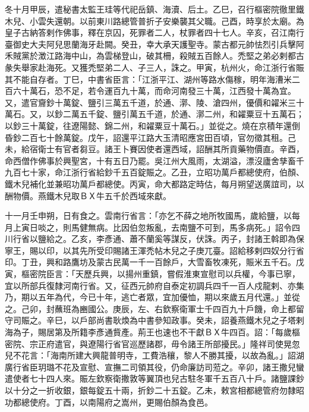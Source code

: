 \begin{pinyinscope}
 冬十月甲辰，遣秘書太監王珪等代祀岳鎮、海瀆、后土。乙巳，召行樞密院徹里鐵木兒、小雲失還朝。以前東川路總管普折子安樂襲其父職。己酉，時享於太廟。為皇子古納答剌作佛事，釋在京囚，死罪者二人，杖罪者四十七人。辛亥，召江南行臺御史大夫阿兒思蘭海牙赴闕。癸丑，幸大承天護聖寺。蒙古都元帥怯烈引兵擊阿禾賊黨於澂江路海中山，為雲梯登山，破其柵，殺賊五百餘人。禿堅之弟必剌都古彖失舉家赴海死。又獲禿堅弟二人、子三人，誅之。甲寅，杭州火，命江浙行省賑其不能自存者。丁巳，中書省臣言：「江浙平江、湖州等路水傷稼，明年海漕米二百六十萬石，恐不足，若令運百九十萬，而命河南發三十萬，江西發十萬為宜。又，遣官齎鈔十萬錠、鹽引三萬五千道，於通、漷、陵、滄四州，優價和糴米三十萬石。又，以鈔二萬五千錠、鹽引萬五千道，於通、漷二州，和糴粟豆十五萬石；以鈔三十萬錠，往遼陽懿、錦二州，和糴粟豆十萬石。」並從之。燒在京積年還倒昏鈔二百七十餘萬錠。戊午，詔還平江路大玉清昭應宮田百頃，官勿徵其租。己未，給宿衛士有官者芻豆。諸王卜賽因使者還西域，詔酬其所貢藥物價直。辛酉，命西僧作佛事於興聖宮，十有五日乃罷。吳江州大風雨，太湖溢，漂沒廬舍孳畜千九百七十家，命江浙行省給鈔千五百錠賑之。乙丑，立昭功萬戶都總使府，伯顏、鐵木兒補化並兼昭功萬戶都總使。丙寅，命大都路定時估，每月朔望送廣誼司，以酬物價。燕鐵木兒取ＢＸ牛五千於西域來獻。



 十一月壬申朔，日有食之。雲南行省言：「亦乞不薛之地所牧國馬，歲給鹽，以每月上寅日啖之，則馬健無病。比因伯忽叛亂，去南鹽不可到，馬多病死。」詔令四川行省以鹽給之。乙亥，李彥通、蕭不蘭奚等謀反，伏誅。丙子，封諸王斡即為保寧王，賜以印，以其先所受印賜諸王渾禿帖木兒之子庚兀臺。詔給移剌四奴分行省印。丁丑，興和路鷹坊及蒙古民萬一千一百餘戶，大雪畜牧凍死，賑米五千石。戊寅，樞密院臣言：「天歷兵興，以揚州重鎮，嘗假淮東宣慰司以兵權，今事已寧，宜以所部兵復隸河南行省。又，征西元帥府自泰定初調兵四千一百人戍龍剌、亦集乃，期以五年為代，今已十年，逃亡者眾，宜加優恤，期以來歲五月代還。」並從之。己卯，封蘸班為豳國公。庚辰，左、右欽察衛軍士千四百九十戶饑，命上都留守司賑之。辛巳，以戶部尚書耿煥為中書參知政事。癸未，詔養燕鐵木兒之子塔剌海為子，賜居第及所籍李彥通貲產。荊王也速也不干獻ＢＸ牛四百。詔：「每歲樞密院、宗正府遣官，與遼陽行省官巡歷諸郡，毋令諸王所部擾民。」隆祥司使晃忽兒不花言：「海南所建大興龍普明寺，工費浩穰，黎人不勝其擾，以故為亂。」詔湖廣行省臣玥璐不花及宣慰、宣撫二司領其役，仍命廉訪司蒞之。辛卯，諸王撒兒蠻遣使者七十四人來。賑左欽察衛撒敦等翼頂也兒古駐冬軍千五百八十戶。諸鹽課鈔以十分之一折收銀，銀每錠五十兩，折鈔二十五錠。乙未，敕宮相都總管府勿隸昭功都總使府。丁酉，以南陽府之嵩州，更賜伯顏為食邑。




\end{pinyinscope}
